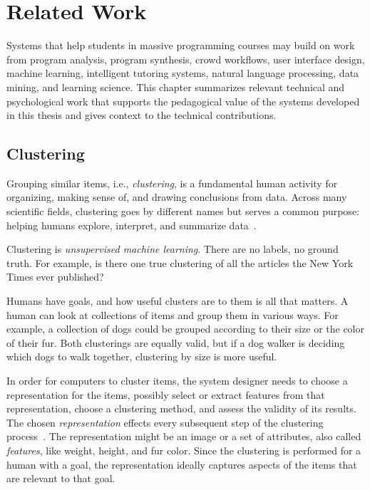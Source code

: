 \chapter{Related Work}\label{chapter:relatedwork}

Systems that help students in massive programming courses may build on work from program analysis, program synthesis, crowd workflows, user interface design, machine learning, intelligent tutoring systems, natural language processing, data mining, and learning science. This chapter summarizes relevant technical and psychological work that supports the pedagogical value of the systems developed in this thesis and gives context to the technical contributions. %


\section{Clustering}


Grouping similar items, i.e., {\it clustering}, is a fundamental human activity for organizing, making sense of, and drawing conclusions from data. Across many scientific fields, clustering goes by different names but serves a common purpose: helping humans explore, interpret, and summarize data~\cite{Jain50}.

Clustering is {\it unsupervised machine learning}. There are no labels, no ground truth. For example, is there one true clustering of all the articles the New York Times ever published?

Humans have goals, and how useful clusters are to them is all that matters. A human can look at collections of items and group them in various ways. For example, a collection of dogs could be grouped according to their size or the color of their fur. Both clusterings are equally valid, but if a dog walker is deciding which dogs to walk together, clustering by size is more useful.

In order for computers to cluster items, the system designer needs to choose a representation for the items, possibly select or extract features from that representation, choose a clustering method, and assess the validity of its results. The chosen {\it representation} effects every subsequent step of the clustering process~\cite{Jain50}. The representation might be an image or a set of attributes, also called {\it features}, like weight, height, and fur color. Since the clustering is performed for a human with a goal, the representation ideally captures aspects of the items that are relevant to that goal.

